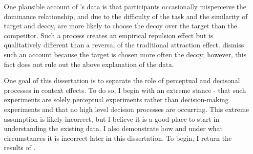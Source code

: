 One plausible account of \textcite{spektorWhenGoodLooks2018b}'s data is that participants occasionally misperceive the dominance relationship, and due to the difficulty of the task and the similarity of target and decoy, are more likely to choose the decoy over the target than the competitor. Such a process creates an empirical repulsion effect but is qualitatively different than a reversal of the traditional attraction effect. \textcite{spektorWhenGoodLooks2018b} dismiss such an account because the target is chosen more often the decoy; however, this fact does not rule out the above explanation of the data.

One goal of this dissertation is to separate the role of perceptual and decisonal processes in context effects. To do so, I begin with an extreme stance - that such experiments are solely perceptual experiments rather than decision-making experiments and that no high level decision processes are occurring. This extreme assumption is likely incorrect, but I believe it is a good place to start in understanding the existing data. I also demonstrate how and under what circumstances it is incorrect later in this dissertation. To begin, I return the results of \textcite{spektorWhenGoodLooks2018b}. 

